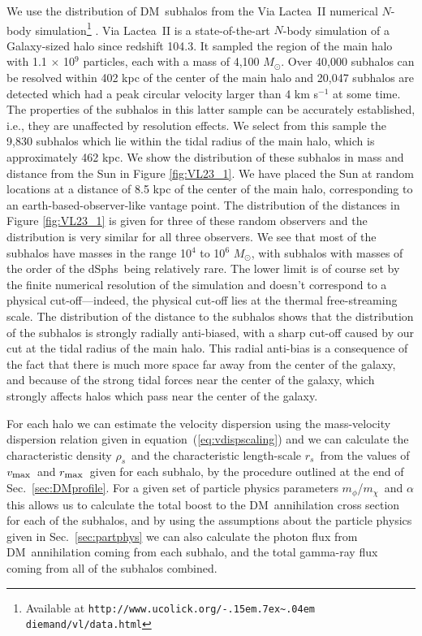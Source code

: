 \documentclass[aps,prd,twocolumn,amsmath,amssymb,floatfix,nofootinbib,10pt]{revtex4}
\newcommand{\ie}{i.e.}
\newcommand{\VL}{Via Lactea}
\newcommand{\DM}{DM}
\newcommand{\mdm}{\ensuremath{m_{\chi}}}
\newcommand{\mv}{\ensuremath{m_{\phi}}}
\newcommand{\eqnname}{equation}
\newcommand{\rhos}{\ensuremath{\rho_s}}
\newcommand{\rs}{\ensuremath{r_s}}
\newcommand{\Msol}{\ensuremath{M_{\odot}}}
\newcommand{\Msun}{\Msol}
\newcommand{\vmax}{\ensuremath{v_{\mbox{{\footnotesize max}}}}}
\newcommand{\rmax}{\ensuremath{r_{\mbox{{\footnotesize max}}}}}
\newcommand{\dSphs}{dSphs}
\def\urltilda{\kern -.15em\lower .7ex\hbox{\~{}}\kern .04em}
\begin{document}
We use the distribution of \DM\ subhalos from the \VL\ II numerical
$N$-body simulation\footnote{Available at
\texttt{http://www.ucolick.org/\urltilda$\!$diemand/vl/data.html}}
\cite{2008Natur.454..735D}. \VL\ II is a state-of-the-art $N$-body
simulation of a Galaxy-sized halo since redshift 104.3. It sampled the
region of the main halo with 1.1 $\times$ 10$^9$ particles, each with
a mass of 4,100 \Msun. Over 40,000 subhalos can be resolved within 402
kpc of the center of the main halo and 20,047 subhalos are detected
which had a peak circular velocity larger than 4 km s$^{-1}$ at some
time. The properties of the subhalos in this latter sample can be
accurately established, \ie, they are unaffected by resolution
effects. We select from this sample the 9,830 subhalos which lie
within the tidal radius of the main halo, which is approximately 462
kpc. We show the distribution of these subhalos in mass and distance
from the Sun in Figure \ref{fig:VL23_1}. We have placed the Sun at
random locations at a distance of 8.5 kpc of the center of the main
halo, corresponding to an earth-based-observer-like vantage point. The
distribution of the distances in Figure \ref{fig:VL23_1} is given for
three of these random observers and the distribution is very similar
for all three observers. We see that most of the subhalos have masses
in the range 10$^4$ to 10$^6$ \Msun, with subhalos with masses of the
order of the \dSphs\ being relatively rare. The lower limit is of
course set by the finite numerical resolution of the simulation and
doesn't correspond to a physical cut-off---indeed, the physical
cut-off lies at the thermal free-streaming scale. The distribution of
the distance to the subhalos shows that the distribution of the
subhalos is strongly radially anti-biased, with a sharp cut-off caused
by our cut at the tidal radius of the main halo. This radial anti-bias
is a consequence of the fact that there is much more space far away
from the center of the galaxy, and because of the strong tidal forces
near the center of the galaxy, which strongly affects halos which pass
near the center of the galaxy.

For each halo we can estimate the velocity dispersion using the
mass-velocity dispersion relation given in \eqnname\
(\ref{eq:vdispscaling}) and we can calculate the characteristic
density \rhos\ and the characteristic length-scale \rs\ from the
values of \vmax\ and \rmax\ given for each subhalo, by the procedure
outlined at the end of Sec.~\ref{sec:DMprofile}. For a given set of
particle physics parameters \mv/\mdm\ and $\alpha$ this allows us to
calculate the total boost to the \DM\ annihilation cross section for
each of the subhalos, and by using the assumptions about the particle
physics given in Sec.~\ref{sec:partphys} we can also calculate the
photon flux from \DM\ annihilation coming from each subhalo, and the
total gamma-ray flux coming from all of the subhalos combined.
\end{document}
